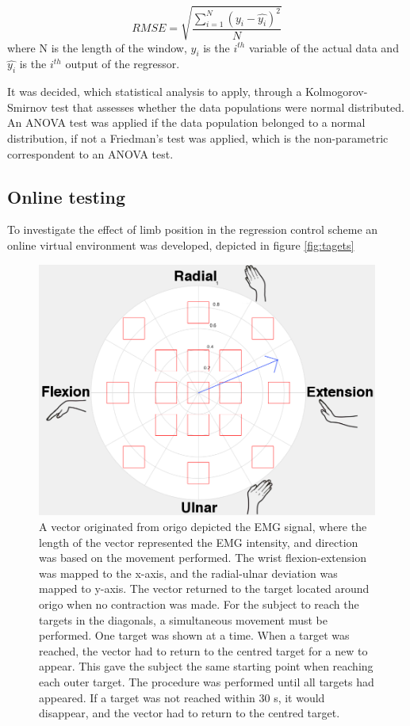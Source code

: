 \begin{equation}\label{eq:rmse}
RMSE = \sqrt{\frac{\sum\limits_{i=1}^N(y_i - \hat{y_i})^2}{N}}
\end{equation}
where N is the length of the window, $y_i$ is the $i^{th}$ variable of the actual data and $\hat{y_i}$ is the $i^{th}$ output of the regressor.

It was decided, which statistical analysis to apply, through a Kolmogorov-Smirnov test that assesses whether the data populations were normal distributed. An ANOVA test was applied if the data population belonged to a normal distribution, if not a Friedman's test was applied, which is the non-parametric correspondent to an ANOVA test.

\subsection{Online testing}
To investigate the effect of limb position in the regression control scheme an online virtual environment was developed, depicted in figure \ref{fig:tagets}

	\begin{figure}[thpb]
		\centering
		\includegraphics[scale=0.25]{Figures/Target}
		\caption{A vector originated from origo depicted the EMG signal, where the length of the vector represented the EMG intensity, and direction was based on the movement performed. The wrist flexion-extension was mapped to the x-axis, and the radial-ulnar deviation was mapped to y-axis. The vector returned to the target located around origo when no contraction was made. For the subject to reach the targets in the diagonals, a simultaneous movement must be performed. One target was shown at a time. When a target was reached, the vector had to return to the centred target for a new to appear. This gave the subject the same starting point when reaching each outer target. The procedure was performed until all targets had appeared. If a target was not reached within 30 s, it would disappear, and the vector had to return to the centred target.}
		\label{fig:targets}
	\end{figure}

